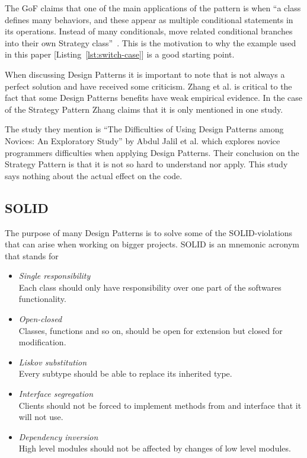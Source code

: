 \documentclass[conference, a4paper]{IEEEtran}
\begin{document}
The GoF claims that one of the main applications of the pattern is when ``a class defines many behaviors, and these appear as multiple conditional statements in its operations. Instead of many conditionals, move related conditional branches into their own Strategy class''~\cite{bibitem:GoF}. This is the motivation to why the example used in this paper [Listing~\ref{lst:switch-case}] is a good starting point.

When discussing Design Patterns it is important to note that is not always a perfect solution and have received some criticism. Zhang et al. is critical to the fact that some Design Patterns benefits have weak empirical evidence. In the case of the Strategy Pattern Zhang claims that it is only mentioned in one study.~\cite{bibitem:Zhang}

The study they mention is ``The Difficulties of Using Design Patterns among Novices: An Exploratory Study'' by Abdul Jalil et al. which explores novice programmers difficulties when applying Design Patterns. Their conclusion on the Strategy Pattern is that it is not so hard to understand nor apply. This study says nothing about the actual effect on the code.~\cite{bibitem:Jalil}

\subsection{SOLID}
The purpose of many Design Patterns is to solve some of the SOLID-violations that can arise when working on bigger projects. SOLID is an mnemonic acronym that stands for
\begin{itemize}
    \item \emph{Single responsibility} \\
    Each class should only have responsibility over one part of the softwares functionality.
    \item \emph{Open-closed} \\
    Classes, functions and so on, should be open for extension but closed for modification.
    \item \emph{Liskov substitution} \\
    Every subtype should be able to replace its inherited type.
    \item \emph{Interface segregation} \\
    Clients should not be forced to implement methods from and interface that it will not use.
    \item \emph{Dependency inversion} \\
    High level modules should not be affected by changes of low level modules.
\end{itemize}
\end{document}
